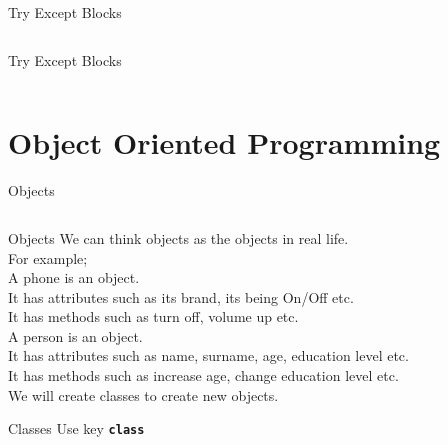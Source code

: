     \begin{frame}{Try Except Blocks}
        \inputminted[frame=single,framesep=2pt]{python3}{../Lecture6/code_examples/try_except_finally.py}
    \end{frame}

    \begin{frame}{Try Except Blocks}
        \inputminted[frame=single,framesep=2pt,lastline=9]{python3}{../Lecture6/code_examples/try_except.py}
    \end{frame}

    \section{Object Oriented Programming}
        \begin{frame}{Objects}
            \inputminted[frame=single,framesep=2pt, lastline = 20]{python3}{code_examples/objects.py}
        \end{frame}

        \begin{frame}{Objects}
            We can think objects as the objects in real life. \\

            For example;\\
            A phone is an object. \\
            It has attributes such as its brand, its being On/Off etc.\\
            It has methods such as turn off, volume up etc.\\

            A person is an object. \\
            It has attributes such as name, surname, age, education level etc.\\
            It has methods such as increase age, change education level etc.\\

            We will create classes to create new objects.

        \end{frame}

        \begin{frame}{Classes}
           Use key \texttt{\textbf{class}}
           \inputminted[frame=single,framesep=2pt, lastline = 20]{python3}{code_examples/class.py}
           \inputminted[frame=single,framesep=2pt, lastline = 20]{python3}{code_examples/class_imp.py}
        \end{frame}


